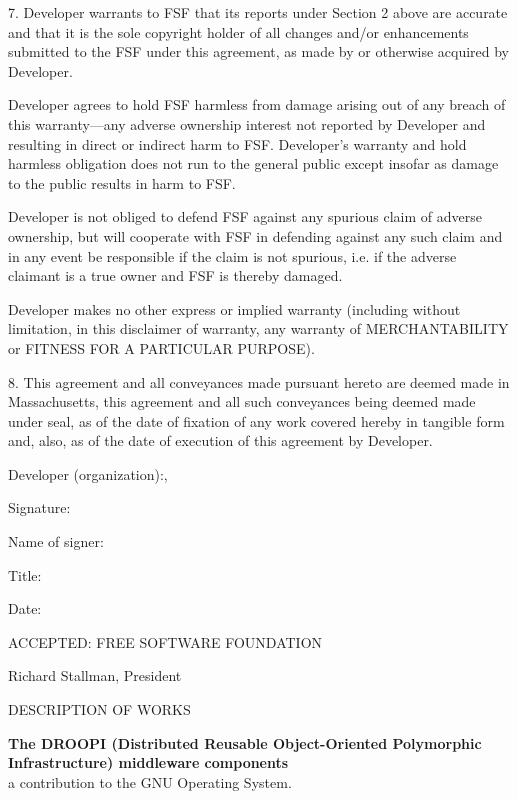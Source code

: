 \documentclass[a4paper,12pt]{article}
\begin{document}
 7. Developer warrants to FSF that its reports under Section 2 above
 are accurate and that it is the sole copyright holder of all changes
 and/or enhancements submitted to the FSF under this agreement, as made
 by or otherwise acquired by Developer.
 
 Developer agrees to hold FSF harmless from damage arising out of any
 breach of this warranty---any adverse ownership interest not reported
 by Developer and resulting in direct or indirect harm to FSF.
 Developer's warranty and hold harmless obligation does not run to the
 general public except insofar as damage to the public results in harm
 to FSF.
 
 Developer is not obliged to defend FSF against any spurious claim of
 adverse ownership, but will cooperate with FSF in defending against
 any such claim and in any event be responsible if the claim is not
 spurious, i.e. if the adverse claimant is a true owner and FSF is
 thereby damaged.
 
 Developer makes no other express or implied warranty (including
 without limitation, in this disclaimer of warranty, any warranty of
 MERCHANTABILITY or FITNESS FOR A PARTICULAR PURPOSE).
 
 8. This agreement and all conveyances made pursuant hereto are deemed
 made in Massachusetts, this agreement and all such conveyances being
 deemed made under seal, as of the date of fixation of any work covered
 hereby in tangible form and, also, as of the date of execution of this
 agreement by Developer.
 
          Developer (organization):\hrulefill,
 
         
 	 Signature:\hrulefill
 
 
          Name of signer:\hrulefill
 
 
          Title:\hrulefill
 
 
          Date:\hrulefill
 
 
 ACCEPTED: FREE SOFTWARE FOUNDATION
 
 Richard Stallman, President

\newpage
\centering DESCRIPTION OF WORKS
 
\vspace{2cm}

\begin{center}
\large 
{\bfseries The DROOPI (Distributed Reusable Object-Oriented
Polymorphic Infrastructure) middleware components}\\
a contribution to the GNU Operating System.
\end{center}
\end{document}
